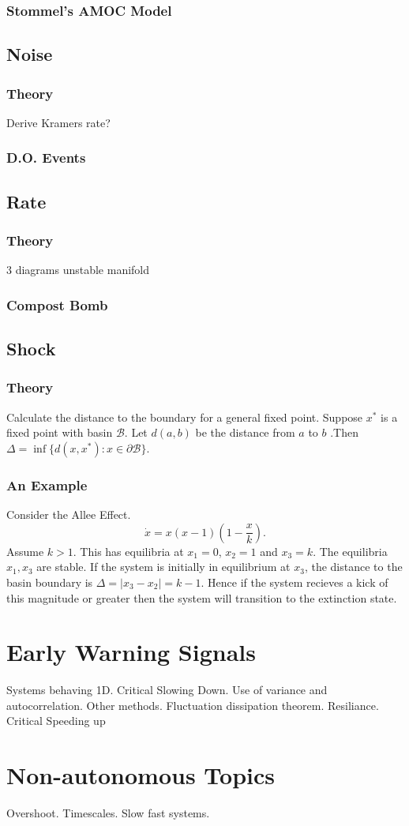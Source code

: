 \subsubsection{Stommel's AMOC Model}
\subsection{Noise}
\subsubsection{Theory}
Derive Kramers rate?
\subsubsection{D.O. Events}
\subsection{Rate}
\subsubsection{Theory}
3 diagrams unstable manifold
\subsubsection{Compost Bomb}
\subsection{Shock}
\subsubsection{Theory}
Calculate the distance to the boundary for a general fixed point. Suppose $x^*$ is a fixed point with basin $\mathcal{B}$. Let $d(a,b)$ be the distance from
$a$ to $b$ .Then $\Delta = \inf \{d(x,x^*) : x \in \partial\mathcal{B}\}$.
\subsubsection{An Example}
Consider the Allee Effect.
\begin{equation}
  \label{eq:allee_effect}
  \dot{x} = x\left(x-1\right)\left(1-\frac{x}{k}\right).
\end{equation}
Assume $k > 1$. This has equilibria at $x_1 = 0$, $x_2 = 1$ and $x_3 = k$. The equilibria $x_1,x_3$ are stable. If the system is
initially in equilibrium at $x_3$, the distance to the basin boundary is $\Delta = |x_3 - x_2| = k - 1$. Hence if the system recieves a kick of
this magnitude or greater then the system will transition to the extinction state.

\section{Early Warning Signals}
Systems behaving 1D. Critical Slowing Down. Use of variance and
autocorrelation. Other methods. Fluctuation dissipation theorem.
Resiliance. Critical Speeding up


\section{Non-autonomous Topics}
Overshoot. Timescales. Slow fast systems.